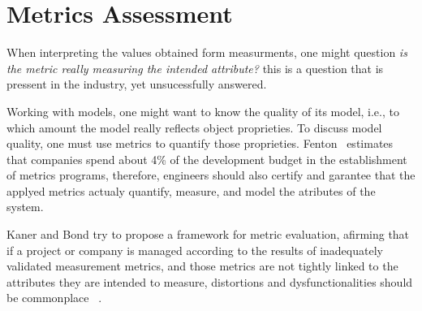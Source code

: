\section{Metrics Assessment} \label{assess}
\begin{comment}
Effective management of any process requires quantification, measurement, and modeling.
Software metrics provide a quantitative basis for the development and validation of models of the software development process.
Metrics can be used to improve software productivity and quality\cite{g1:Millis:1998}.
\end{comment}



\par When interpreting the values obtained form measurments, one might question \emph{is the metric really measuring the intended attribute?} this is a question that is pressent in the industry, yet unsucessfully answered. 

\par Working with models, one might want to know the quality of its model, i.e., to which amount the model really reflects object proprieties. To discuss model quality, one must use metrics to quantify those proprieties. Fenton~\cite{g1:Fenton:1999} estimates that companies spend about 4\% of the development budget in the establishment of metrics programs, therefore, engineers should also certify and garantee that the applyed metrics actualy quantify, measure, and model the atributes of the system.

\par Kaner and Bond try to propose a framework for metric evaluation, afirming that if a project or company is managed according to the results of inadequately validated measurement metrics, and those metrics are not tightly linked to the attributes they are intended to measure, distortions and dysfunctionalities should be commonplace ~\cite{g1:kaner:2004}.

\begin{comment}
	This has a likely consequence: if a project or company is managed according to the results of measurements, and those metrics are inadequately validated, insuficiently understood, and not tightly linked to the attributes they are intended to measure, measurement distortions and dysfunctional should be commonplace\cite{g1:kaner:2004}.
\end{comment}


